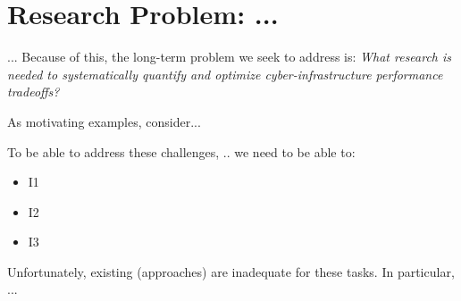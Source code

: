 \section{Research Problem: ...}
\label{sec:problem}

... Because of this, the 
long-term problem we seek to address is: \emph{What research is needed to systematically 
quantify and optimize cyber-infrastructure performance tradeoffs?}

As motivating examples, consider... 

To be able to address these challenges, .. we need to be able to:
\begin{itemize}
\item I1
\item I2
\item I3
\end{itemize}

Unfortunately, existing (approaches) are inadequate for these tasks. In particular, ...

